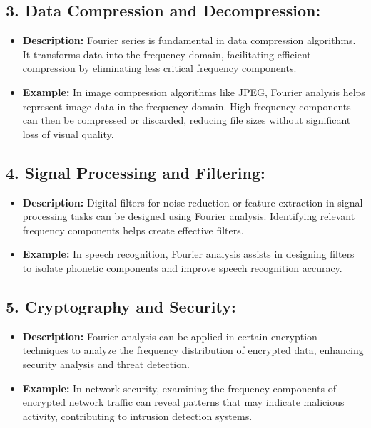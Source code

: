 \documentclass[11pt]{article}
\begin{document}
\hypertarget{data-compression-and-decompression}{%
\subsection{\texorpdfstring{3. \textbf{Data Compression and
Decompression:}}{3. Data Compression and Decompression:}}\label{data-compression-and-decompression}}

\begin{itemize}
\item
  \textbf{Description:} Fourier series is fundamental in data
  compression algorithms. It transforms data into the frequency domain,
  facilitating efficient compression by eliminating less critical
  frequency components.
\item
  \textbf{Example:} In image compression algorithms like JPEG, Fourier
  analysis helps represent image data in the frequency domain.
  High-frequency components can then be compressed or discarded,
  reducing file sizes without significant loss of visual quality.
\end{itemize}

\hypertarget{signal-processing-and-filtering}{%
\subsection{\texorpdfstring{4. \textbf{Signal Processing and
Filtering:}}{4. Signal Processing and Filtering:}}\label{signal-processing-and-filtering}}

\begin{itemize}
\item
  \textbf{Description:} Digital filters for noise reduction or feature
  extraction in signal processing tasks can be designed using Fourier
  analysis. Identifying relevant frequency components helps create
  effective filters.
\item
  \textbf{Example:} In speech recognition, Fourier analysis assists in
  designing filters to isolate phonetic components and improve speech
  recognition accuracy.
\end{itemize}

\hypertarget{cryptography-and-security}{%
\subsection{\texorpdfstring{5. \textbf{Cryptography and
Security:}}{5. Cryptography and Security:}}\label{cryptography-and-security}}

\begin{itemize}
\item
  \textbf{Description:} Fourier analysis can be applied in certain
  encryption techniques to analyze the frequency distribution of
  encrypted data, enhancing security analysis and threat detection.
\item
  \textbf{Example:} In network security, examining the frequency
  components of encrypted network traffic can reveal patterns that may
  indicate malicious activity, contributing to intrusion detection
  systems.
\end{itemize}
\end{document}
